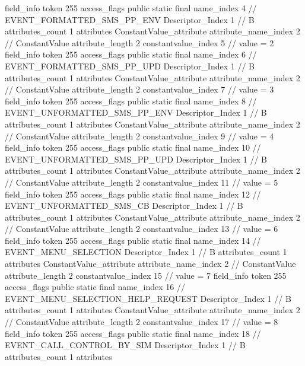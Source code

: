 {{{{{{{				}
				}
			}
			field_info {
				token	255
				access_flags	public static final
				name_index	4		// EVENT_FORMATTED_SMS_PP_ENV
				Descriptor_Index	1		// B
				attributes_count	1
				attributes {
				ConstantValue_attribute {
					attribute_name_index	2		// ConstantValue
					attribute_length	2
					constantvalue_index	5		// value = 2
				}
				}
			}
			field_info {
				token	255
				access_flags	public static final
				name_index	6		// EVENT_FORMATTED_SMS_PP_UPD
				Descriptor_Index	1		// B
				attributes_count	1
				attributes {
				ConstantValue_attribute {
					attribute_name_index	2		// ConstantValue
					attribute_length	2
					constantvalue_index	7		// value = 3
				}
				}
			}
			field_info {
				token	255
				access_flags	public static final
				name_index	8		// EVENT_UNFORMATTED_SMS_PP_ENV
				Descriptor_Index	1		// B
				attributes_count	1
				attributes {
				ConstantValue_attribute {
					attribute_name_index	2		// ConstantValue
					attribute_length	2
					constantvalue_index	9		// value = 4
				}
				}
			}
			field_info {
				token	255
				access_flags	public static final
				name_index	10		// EVENT_UNFORMATTED_SMS_PP_UPD
				Descriptor_Index	1		// B
				attributes_count	1
				attributes {
				ConstantValue_attribute {
					attribute_name_index	2		// ConstantValue
					attribute_length	2
					constantvalue_index	11		// value = 5
				}
				}
			}
			field_info {
				token	255
				access_flags	public static final
				name_index	12		// EVENT_UNFORMATTED_SMS_CB
				Descriptor_Index	1		// B
				attributes_count	1
				attributes {
				ConstantValue_attribute {
					attribute_name_index	2		// ConstantValue
					attribute_length	2
					constantvalue_index	13		// value = 6
				}
				}
			}
			field_info {
				token	255
				access_flags	public static final
				name_index	14		// EVENT_MENU_SELECTION
				Descriptor_Index	1		// B
				attributes_count	1
				attributes {
				ConstantValue_attribute {
					attribute_name_index	2		// ConstantValue
					attribute_length	2
					constantvalue_index	15		// value = 7
				}
				}
			}
			field_info {
				token	255
				access_flags	public static final
				name_index	16		// EVENT_MENU_SELECTION_HELP_REQUEST
				Descriptor_Index	1		// B
				attributes_count	1
				attributes {
				ConstantValue_attribute {
					attribute_name_index	2		// ConstantValue
					attribute_length	2
					constantvalue_index	17		// value = 8
				}
				}
			}
			field_info {
				token	255
				access_flags	public static final
				name_index	18		// EVENT_CALL_CONTROL_BY_SIM
				Descriptor_Index	1		// B
				attributes_count	1
				attributes {
}}}}}}
